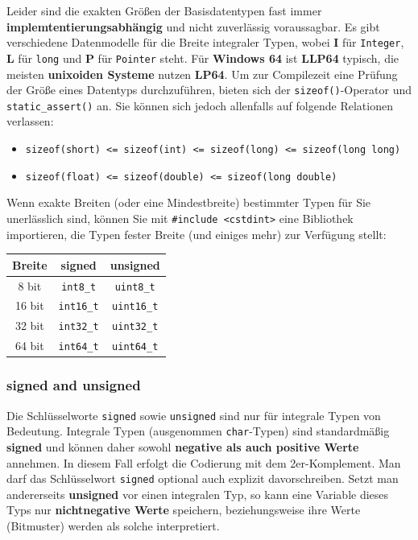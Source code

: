 \documentclass[a4paper]{report}
\begin{document}
Leider sind die exakten Größen der Basisdatentypen fast immer \textbf{implemtentierungsabhängig} und nicht zuverlässig voraussagbar. Es gibt verschiedene Datenmodelle für die Breite integraler Typen, wobei \textbf{I} für \texttt{Integer}, \textbf{L} für \texttt{long} und \textbf{P} für \texttt{Pointer} steht. Für \textbf{Windows 64} ist \textbf{LLP64} typisch, die meisten \textbf{unixoiden Systeme} nutzen \textbf{LP64}. Um zur Compilezeit eine Prüfung der Größe eines Datentyps durchzuführen, bieten sich der \texttt{sizeof()}-Operator und \texttt{static\_assert()} an. Sie können sich jedoch allenfalls auf folgende Relationen verlassen:

\begin{itemize}
	\item \texttt{sizeof(short) \quad <= \quad sizeof(int) \quad <= \quad sizeof(long) \quad <= \quad sizeof(long long)}
	\item \texttt{sizeof(float) \quad <= \quad sizeof(double) \quad <= \quad sizeof(long double)}
\end{itemize}

\begin{multicols}{2}
Wenn exakte Breiten (oder eine Mindestbreite) bestimmter Typen für Sie unerlässlich sind, können Sie mit \texttt{\#include <cstdint>} eine Bibliothek importieren, die Typen fester Breite (und einiges mehr) zur Verfügung stellt:

\begin{center}
\begin{tabular}{|c||cc|}
	\hline
	\textbf{Breite} & \textbf{signed} & \textbf{unsigned} \\ \hline
	8 bit & \texttt{int8\_t} & \texttt{uint8\_t} \\
	16 bit & \texttt{int16\_t} & \texttt{uint16\_t} \\
	32 bit & \texttt{int32\_t} & \texttt{uint32\_t} \\
	64 bit & \texttt{int64\_t} & \texttt{uint64\_t} \\
	\hline
	
\end{tabular}
\end{center}
\end{multicols}

\subsubsection{signed and unsigned}
Die Schlüsselworte \texttt{signed} sowie \texttt{unsigned} sind nur für integrale Typen von Bedeutung. Integrale Typen (ausgenommen \texttt{char}-Typen) sind standardmäßig \textbf{signed} und können daher sowohl \textbf{negative als auch positive Werte} annehmen. In diesem Fall erfolgt die Codierung mit dem 2er-Komplement. Man darf das Schlüsselwort \texttt{signed} optional auch explizit davorschreiben. Setzt man andererseits \textbf{unsigned} vor einen integralen Typ, so kann eine Variable dieses Typs nur \textbf{nichtnegative Werte} speichern, beziehungsweise ihre Werte (Bitmuster) werden als solche interpretiert.
\end{document}
